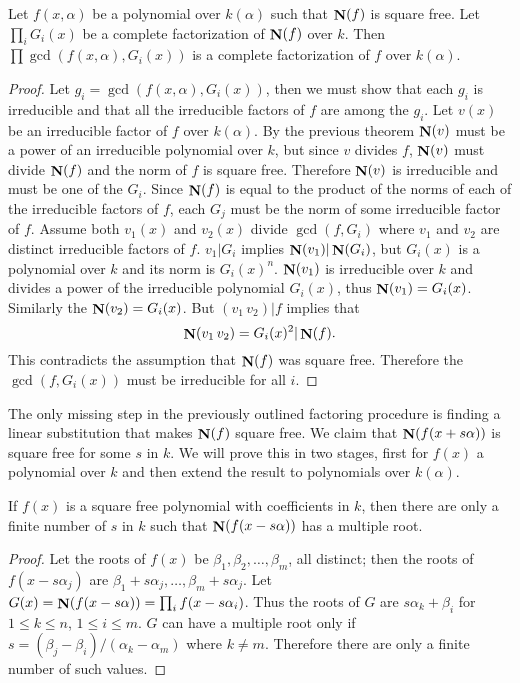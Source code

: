 \begin{proposition}
Let $f(x,\alpha)$ be a polynomial over $k(\alpha)$ such that $\mathop{\mathbf{N}}\nolimits(f)$ is
square free.  Let $\prod_i G_i(x)$ be a complete factorization of
$\mathop{\mathbf{N}}\nolimits(f)$ over $k$.  Then $\prod\gcd(f(x,\alpha),G_i(x))$ is a complete
factorization of $f$ over $k(\alpha)$.
\end{proposition}


\begin{proof}
Let $g_i=\gcd(f(x,\alpha),G_i(x))$, then we must show that each $g_i$ is
irreducible and that all the irreducible factors of $f$ are among the
$g_i$.  Let $v(x)$ be an irreducible factor of $f$ over $k(\alpha)$.  By
the previous theorem $\mathop{\mathbf{N}}\nolimits(v)$ must be a power of an irreducible
polynomial over $k$, but since $v$ divides $f$, $\mathop{\mathbf{N}}\nolimits(v)$ must divide
$\mathop{\mathbf{N}}\nolimits(f)$ and the norm of $f$ is square free.  Therefore $\mathop{\mathbf{N}}\nolimits(v)$ is
irreducible and must be one of the $G_i$.  Since $\mathop{\mathbf{N}}\nolimits(f)$ is equal to the
product of the norms of each of the irreducible factors of $f$, each $G_j$
must be the norm of some irreducible factor of $f$.  Assume both $v_1(x)$
and $v_2(x)$ divide $\gcd(f,G_i)$ where $v_1$ and $v_2$ are distinct
irreducible factors of $f$.  $v_1 | G_i$ implies $\mathop{\mathbf{N}}\nolimits(v_1) | \mathop{\mathbf{N}}\nolimits(G_i)$,
but $G_i(x)$ is a polynomial over $k$ and its norm is $G_i(x)^n$.
$\mathop{\mathbf{N}}\nolimits(v_1)$ is irreducible over $k$ and divides a power of the irreducible
polynomial $G_i(x)$, thus $\mathop{\mathbf{N}}\nolimits(v_1)=G_i(x)$.  Similarly the
$\mathop{\mathbf{N}}\nolimits(v_2)=G_i(x)$.  But $(v_1\,v_2) | f$ implies that
\[
\mathop{\mathbf{N}}\nolimits(v_1\,v_2)=G_i(x)^2 | \mathop{\mathbf{N}}\nolimits(f).
\]
This contradicts the assumption that $\mathop{\mathbf{N}}\nolimits(f)$ was square free. 
Therefore the $\gcd(f,G_i(x))$ must be irreducible for all $i$.
\end{proof}

The only missing step in the previously outlined factoring procedure
is finding a linear substitution that makes $\mathop{\mathbf{N}}\nolimits(f)$ square free.  We claim
that $\mathop{\mathbf{N}}\nolimits(f(x+s\alpha))$ is square free for some $s$ in $k$.  We
will prove this in two stages, first for $f(x)$ a polynomial over $k$
and then extend the result to polynomials over $k(\alpha)$.

\begin{proposition}
\label{SqfreeNorm:Prop}
If $f(x)$ is a square free polynomial with coefficients in $k$, then
there are only a finite number of $s$ in $k$ such that
$\mathop{\mathbf{N}}\nolimits(f(x-s\alpha))$ has a multiple root.
\end{proposition}

\begin{proof}
Let the roots of $f(x)$ be $\beta_1,\beta_2,\ldots,\beta_m$,
all distinct; then the roots of $f(x-s\alpha_j)$ are
$\beta_1 + s\alpha_j,\ldots,\beta_m+s\alpha_j$.
Let $G(x) = \mathop{\mathbf{N}}\nolimits(f(x-s\alpha)) = \prod_i f(x-s\alpha_i)$.  Thus
the roots of $G$ are 
$s \alpha_k+\beta_i$ for $1 \leq k \leq n$, $1\leq i \leq m$.  $G$ can have a
multiple root only if 
$s = (\beta_j-\beta_i)/(\alpha_k-\alpha_m)$ where $k\not=m$.
Therefore there are only a finite number of such values.
\end{proof}


